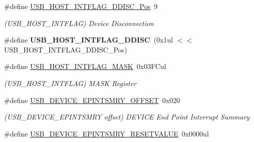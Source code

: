 \begin{DoxyCompactItemize}
\item 
\hypertarget{group___s_a_m_l21___u_s_b_gaa82b03dd5f0da27fa0616d1c04633c47}{}\#define \hyperlink{group___s_a_m_l21___u_s_b_gaa82b03dd5f0da27fa0616d1c04633c47}{U\+S\+B\+\_\+\+H\+O\+S\+T\+\_\+\+I\+N\+T\+F\+L\+A\+G\+\_\+\+D\+D\+I\+S\+C\+\_\+\+Pos}~9\label{group___s_a_m_l21___u_s_b_gaa82b03dd5f0da27fa0616d1c04633c47}

\begin{DoxyCompactList}\small\item\em (U\+S\+B\+\_\+\+H\+O\+S\+T\+\_\+\+I\+N\+T\+F\+L\+A\+G) Device Disconnection \end{DoxyCompactList}\item 
\hypertarget{group___s_a_m_l21___u_s_b_gab8151e135db59f34c2a7cc61161425b1}{}\#define {\bfseries U\+S\+B\+\_\+\+H\+O\+S\+T\+\_\+\+I\+N\+T\+F\+L\+A\+G\+\_\+\+D\+D\+I\+S\+C}~(0x1ul $<$$<$ U\+S\+B\+\_\+\+H\+O\+S\+T\+\_\+\+I\+N\+T\+F\+L\+A\+G\+\_\+\+D\+D\+I\+S\+C\+\_\+\+Pos)\label{group___s_a_m_l21___u_s_b_gab8151e135db59f34c2a7cc61161425b1}

\item 
\hypertarget{group___s_a_m_l21___u_s_b_ga54c9228eedf365b92dff6c64effd515b}{}\#define \hyperlink{group___s_a_m_l21___u_s_b_ga54c9228eedf365b92dff6c64effd515b}{U\+S\+B\+\_\+\+H\+O\+S\+T\+\_\+\+I\+N\+T\+F\+L\+A\+G\+\_\+\+M\+A\+S\+K}~0x03\+F\+Cul\label{group___s_a_m_l21___u_s_b_ga54c9228eedf365b92dff6c64effd515b}

\begin{DoxyCompactList}\small\item\em (U\+S\+B\+\_\+\+H\+O\+S\+T\+\_\+\+I\+N\+T\+F\+L\+A\+G) M\+A\+S\+K Register \end{DoxyCompactList}\item 
\hypertarget{group___s_a_m_l21___u_s_b_ga763dc45e1dc0d080d1d916368316666e}{}\#define \hyperlink{group___s_a_m_l21___u_s_b_ga763dc45e1dc0d080d1d916368316666e}{U\+S\+B\+\_\+\+D\+E\+V\+I\+C\+E\+\_\+\+E\+P\+I\+N\+T\+S\+M\+R\+Y\+\_\+\+O\+F\+F\+S\+E\+T}~0x020\label{group___s_a_m_l21___u_s_b_ga763dc45e1dc0d080d1d916368316666e}

\begin{DoxyCompactList}\small\item\em (U\+S\+B\+\_\+\+D\+E\+V\+I\+C\+E\+\_\+\+E\+P\+I\+N\+T\+S\+M\+R\+Y offset) D\+E\+V\+I\+C\+E End Point Interrupt Summary \end{DoxyCompactList}\item 
\hypertarget{group___s_a_m_l21___u_s_b_ga957354efce4bea8a73511a51398f5cdf}{}\#define \hyperlink{group___s_a_m_l21___u_s_b_ga957354efce4bea8a73511a51398f5cdf}{U\+S\+B\+\_\+\+D\+E\+V\+I\+C\+E\+\_\+\+E\+P\+I\+N\+T\+S\+M\+R\+Y\+\_\+\+R\+E\+S\+E\+T\+V\+A\+L\+U\+E}~0x0000ul\label{group___s_a_m_l21___u_s_b_ga957354efce4bea8a73511a51398f5cdf}


\end{DoxyCompactItemize}
